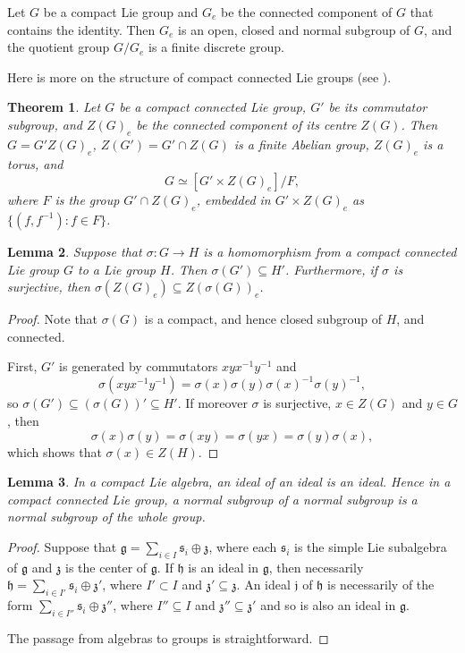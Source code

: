 \documentclass[12pt,twoside,a4paper]{amsart}
\newtheorem{thm}{Theorem}[section]
\newtheorem{lem}[thm]{Lemma}%
\theoremstyle{definition}
\theoremstyle{remark}
\numberwithin{equation}{section}
\newcommand{\Lie}[1]{\mathfrak{#1}}
\begin{document}
Let $G$ be a compact Lie group and $G_e$ be the connected component of $G$ that contains the identity.
Then $G_e$ is an open, closed and normal subgroup of $G$, and the quotient group $G/G_e$ is a finite discrete group.


Here is more on the structure of compact connected Lie groups (see \cite[Theorem 5.22]{Sep07}). 
\begin{thm}\label{cptconnected} Let $G$ be a compact connected Lie group, $G'$ be its commutator subgroup, and $Z(G)_e$ be the connected component of its centre $Z(G)$. 
Then $G = G'Z(G)_e$, $Z(G') = G'\cap Z(G)$ is a finite Abelian group, $Z(G)_e$ is a torus, and
\[
G \simeq [ G'\times Z(G)_e ]/F, 
\]
where $F$ is the group $G'\cap Z(G)_e$,  embedded in $G'\times Z(G)_e$ as
$\{( f, f^{-1}): f \in F\}$.
\end{thm}


\begin{lem}\label{lem:homo-cpct-Lie-gps}
Suppose that $\sigma\colon  G\to H$ is a homomorphism from a compact connected Lie group $G$ to a Lie group $H$.
Then $\sigma(G') \subseteq H'$.
Furthermore, if $\sigma$ is surjective, then $\sigma(Z(G)_e) \subseteq Z(\sigma(G))_e$.
\end{lem}

\begin{proof}
Note that $\sigma(G)$ is a compact, and hence closed subgroup of $H$, and connected. 

First, $G'$ is generated by commutators $x y x^{-1}y^{-1}$ and 
\[
\sigma (x y x^{-1}y^{-1}) = \sigma(x) \sigma(y) \sigma(x)^{-1} \sigma(y)^{-1}, 
\]
so $\sigma(G') \subseteq (\sigma(G))' \subseteq H'$.
If moreover $\sigma$ is surjective, $x \in Z(G)$ and $y \in G$, then 
\[
\sigma(x)\sigma(y) = \sigma(xy) = \sigma(yx) = \sigma(y) \sigma(x) ,
\]
which shows that $\sigma(x) \in Z(H)$.
\end{proof}


\begin{lem}\label{lem:ideal in ideal}
In a compact Lie algebra, an ideal of an ideal is an ideal.
Hence in a compact connected Lie group, a normal subgroup of a normal subgroup is a normal subgroup of the whole group.
\end{lem}
\begin{proof}
Suppose that  $\Lie{g} = \sum_{i \in I} \Lie{s}_i \oplus \Lie{z}$, where each $\Lie{s}_i$ is the simple Lie subalgebra of $\Lie{g}$ and $\Lie{z}$ is the center of $\Lie{g}$.
If $\Lie{h}$ is an ideal in $\Lie{g}$, then necessarily $\Lie{h} = \sum_{i \in I'} \Lie{s}_i \oplus \Lie{z}'$, where $I' \subset I$ and $\Lie{z}' \subseteq \Lie{z}$. 
An ideal $\Lie{j}$ of $\Lie{h}$ is necessarily of the form  $\sum_{i \in I''} \Lie{s}_i \oplus \Lie{z}''$, where $I'' \subseteq I$ and $\Lie{z}'' \subseteq \Lie{z}'$ and so is also an ideal in $\Lie{g}$.

The passage from algebras to groups is straightforward.
\end{proof}
\end{document}
